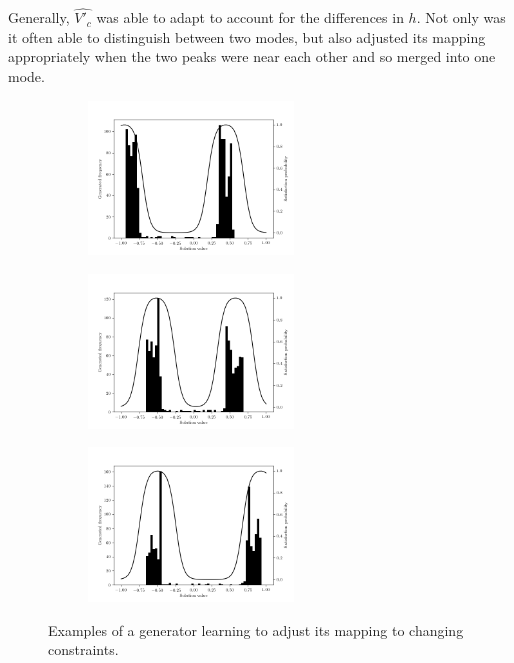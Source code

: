 \documentclass[../../main.tex]{subfiles}
\begin{document}
Generally, $\hat{V'_c}$ was able to adapt to account for the differences in $h$.
Not only was it often able to distinguish between two modes, but also adjusted its mapping appropriately when the two peaks were near each other and so merged into one mode.
\begin{figure}[H]
    \centering
    \begin{subfigure}[a]{1.\textwidth}
        \centering
        \includegraphics[width=0.6\textwidth]{embeddedConstraint1}
    \end{subfigure}
    \begin{subfigure}[a]{1.\textwidth}
        \centering
        \includegraphics[width=0.6\textwidth]{embeddedConstraint2}
    \end{subfigure}
    \begin{subfigure}[a]{1.\textwidth}
        \centering
        \includegraphics[width=0.6\textwidth]{embeddedConstraint5}
    \end{subfigure}
    \caption{
        Examples of a generator learning to adjust its mapping to changing constraints.
    }
\label{fig:embeddedConstraintsBimodal}
\end{figure}
\end{document}
